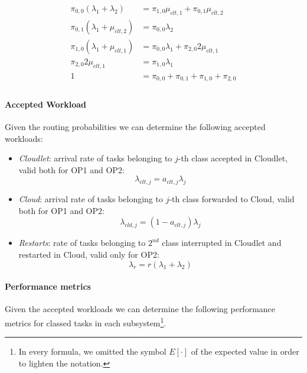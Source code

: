 \begin{equation}
	\begin{split}
		\pi_{0,0}(\lambda_{1}+\lambda_{2})& = \pi_{1,0}\mu_{clt,1}+\pi_{0,1}\mu_{clt,2} \\
		\pi_{0,1}(\lambda_{1}+\mu_{clt,2}) & = \pi_{0,0}\lambda_{2} \\
		\pi_{1,0}(\lambda_{1}+\mu_{clt,1}) & = \pi_{0,0}\lambda_{1}+\pi_{2,0}2\mu_{clt,1} \\
		\pi_{2,0}2\mu_{clt,1} & = \pi_{1,0}\lambda_{1} \\
		1 & = \pi_{0,0}+\pi_{0,1}+\pi_{1,0}+\pi_{2,0}\\
	\end{split}
	\label{eqn:analytical-model-markov-2-1}
\end{equation}

\paragraph{Accepted Workload}
Given the routing probabilities we can determine the following accepted workloads:

\begin{itemize}
	\item \textit{Cloudlet}: arrival rate of tasks belonging to $j$-th class accepted in Cloudlet, valid both for OP1 and OP2:
	\begin{equation}
	\lambda_{clt,j} = a_{clt,j}\lambda_{j}
	\end{equation}
	
	\item \textit{Cloud}: arrival rate of tasks belonging to $j$-th class forwarded to Cloud, valid both for OP1 and OP2:
	\begin{equation}
	\lambda_{cld,j} = (1-a_{clt,j})\lambda_{j}
	\end{equation}
	
	\item \textit{Restarts}: rate of tasks belonging to $2^{nd}$ class interrupted in Cloudlet and restarted in Cloud, valid only for OP2:
	\begin{equation}
	\lambda_{r} = r(\lambda_{1}+\lambda_{2})
	\end{equation}
\end{itemize}

\paragraph{Performance metrics}
Given the accepted workloads we can determine the following performance metrics for classed tasks in each subsystem\footnote{In every formula, we omitted the symbol $E[\cdot]$ of the expected value in order to lighten the notation.}.

